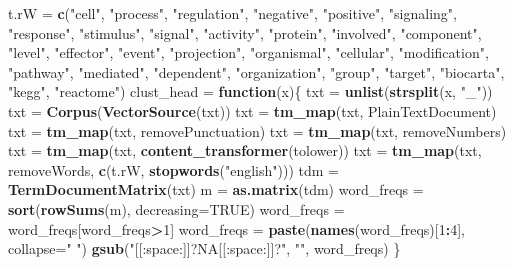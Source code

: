 \documentclass[9pt,a4paper,]{extarticle}
\newenvironment{Shaded}{\begin{snugshade}}{\end{snugshade}}
\newcommand{\KeywordTok}[1]{\textcolor[rgb]{0.13,0.29,0.53}{\textbf{#1}}}
\newcommand{\DataTypeTok}[1]{\textcolor[rgb]{0.13,0.29,0.53}{#1}}
\newcommand{\DecValTok}[1]{\textcolor[rgb]{0.00,0.00,0.81}{#1}}
\newcommand{\StringTok}[1]{\textcolor[rgb]{0.31,0.60,0.02}{#1}}
\newcommand{\OtherTok}[1]{\textcolor[rgb]{0.56,0.35,0.01}{#1}}
\newcommand{\ControlFlowTok}[1]{\textcolor[rgb]{0.13,0.29,0.53}{\textbf{#1}}}
\newcommand{\OperatorTok}[1]{\textcolor[rgb]{0.81,0.36,0.00}{\textbf{#1}}}
\newcommand{\NormalTok}[1]{#1}
\theoremstyle{definition}
\theoremstyle{definition}
\theoremstyle{definition}
\theoremstyle{remark}
\begin{document}
\begin{Shaded}
\begin{Highlighting}[]
\NormalTok{t.rW =}\StringTok{ }\KeywordTok{c}\NormalTok{(}\StringTok{"cell"}\NormalTok{, }\StringTok{"process"}\NormalTok{, }\StringTok{"regulation"}\NormalTok{, }\StringTok{"negative"}\NormalTok{, }\StringTok{"positive"}\NormalTok{, }\StringTok{"signaling"}\NormalTok{, }
         \StringTok{"response"}\NormalTok{, }\StringTok{"stimulus"}\NormalTok{, }\StringTok{"signal"}\NormalTok{, }\StringTok{"activity"}\NormalTok{, }\StringTok{"protein"}\NormalTok{, }\StringTok{"involved"}\NormalTok{, }
         \StringTok{"component"}\NormalTok{, }\StringTok{"level"}\NormalTok{, }\StringTok{"effector"}\NormalTok{, }\StringTok{"event"}\NormalTok{, }\StringTok{"projection"}\NormalTok{, }\StringTok{"organismal"}\NormalTok{, }
         \StringTok{"cellular"}\NormalTok{, }\StringTok{"modification"}\NormalTok{, }\StringTok{"pathway"}\NormalTok{, }\StringTok{"mediated"}\NormalTok{, }\StringTok{"dependent"}\NormalTok{, }
         \StringTok{"organization"}\NormalTok{, }\StringTok{"group"}\NormalTok{, }\StringTok{"target"}\NormalTok{, }\StringTok{"biocarta"}\NormalTok{, }\StringTok{"kegg"}\NormalTok{, }\StringTok{"reactome"}\NormalTok{)}
\NormalTok{clust_head =}\StringTok{ }\ControlFlowTok{function}\NormalTok{(x)\{}
\NormalTok{  txt =}\StringTok{ }\KeywordTok{unlist}\NormalTok{(}\KeywordTok{strsplit}\NormalTok{(x, }\StringTok{"_"}\NormalTok{))}
\NormalTok{  txt =}\StringTok{ }\KeywordTok{Corpus}\NormalTok{(}\KeywordTok{VectorSource}\NormalTok{(txt))}
\NormalTok{  txt =}\StringTok{ }\KeywordTok{tm_map}\NormalTok{(txt, PlainTextDocument)}
\NormalTok{  txt =}\StringTok{ }\KeywordTok{tm_map}\NormalTok{(txt, removePunctuation)}
\NormalTok{  txt =}\StringTok{ }\KeywordTok{tm_map}\NormalTok{(txt, removeNumbers)}
\NormalTok{  txt =}\StringTok{ }\KeywordTok{tm_map}\NormalTok{(txt, }\KeywordTok{content_transformer}\NormalTok{(tolower))}
\NormalTok{  txt =}\StringTok{ }\KeywordTok{tm_map}\NormalTok{(txt, removeWords, }\KeywordTok{c}\NormalTok{(t.rW, }\KeywordTok{stopwords}\NormalTok{(}\StringTok{"english"}\NormalTok{)))}
\NormalTok{  tdm =}\StringTok{ }\KeywordTok{TermDocumentMatrix}\NormalTok{(txt)}
\NormalTok{  m =}\StringTok{ }\KeywordTok{as.matrix}\NormalTok{(tdm)}
\NormalTok{  word_freqs =}\StringTok{ }\KeywordTok{sort}\NormalTok{(}\KeywordTok{rowSums}\NormalTok{(m), }\DataTypeTok{decreasing=}\OtherTok{TRUE}\NormalTok{) }
\NormalTok{  word_freqs =}\StringTok{ }\NormalTok{word_freqs[word_freqs}\OperatorTok{>}\DecValTok{1}\NormalTok{]}
\NormalTok{  word_freqs =}\StringTok{ }\KeywordTok{paste}\NormalTok{(}\KeywordTok{names}\NormalTok{(word_freqs)[}\DecValTok{1}\OperatorTok{:}\DecValTok{4}\NormalTok{], }\DataTypeTok{collapse=}\StringTok{" "}\NormalTok{)}
  \KeywordTok{gsub}\NormalTok{(}\StringTok{"[[:space:]]?NA[[:space:]]?"}\NormalTok{, }\StringTok{""}\NormalTok{, word_freqs)}
\NormalTok{\}}
\end{Highlighting}
\end{Shaded}
\end{document}

